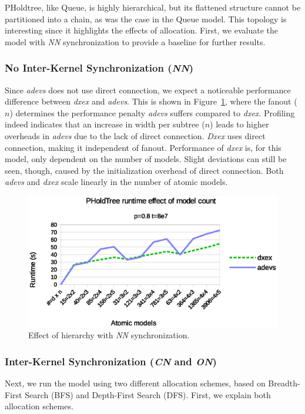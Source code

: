 PHoldtree, like Queue, is highly hierarchical, but its flattened structure cannot be partitioned into a chain, as was the case in the Queue model.
This topology is interesting since it highlights the effects of allocation.
First, we evaluate the model with \textit{NN} synchronization to provide a baseline for further results.

\subsubsection{No Inter-Kernel Synchronization (\textit{NN})}
Since \textit{adevs} does not use direct connection, we expect a noticeable performance difference between \textit{dxex} and \textit{adevs}.
This is shown in Figure~\ref{fig:PHOLDtree_seq_dn_benchmark}, where the fanout ($n$) determines the performance penalty \textit{adevs} suffers compared to \textit{dxex}.
Profiling indeed indicates that an increase in width per subtree ($n$) leads to higher overheads in \textit{adevs} due to the lack of direct connection.
\textit{Dxex} uses direct connection, making it independent of fanout.
Performance of \textit{dxex} is, for this model, only dependent on the number of models.
Slight deviations can still be seen, though, caused by the initialization overhead of direct connection.
Both \textit{adevs} and \textit{dxex} scale linearly in the number of atomic models.

\begin{figure}
    \center
    \includegraphics[width=\columnwidth]{fig/pholdtree_sequential_dn.eps}
    \caption{Effect of hierarchy with \textit{NN} synchronization.}
    \label{fig:PHOLDtree_seq_dn_benchmark}
\end{figure}

\subsubsection{Inter-Kernel Synchronization (\textit{CN} and \textit{ON})}
Next, we run the model using two different allocation schemes, based on Breadth-First Search (BFS) and Depth-First Search (DFS).
First, we explain both allocation schemes.

